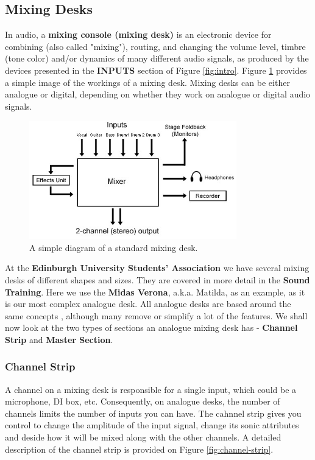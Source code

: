 \documentclass[14pt]{article} %
\begin{document}
\subsection{Mixing Desks}
\label{mixing-desks}
In audio, a \textbf{mixing console (mixing desk)} is an electronic device for combining (also called "mixing"), routing, and changing the volume level, timbre (tone color) and/or dynamics of many different audio signals, as produced by the devices presented in the \textbf{INPUTS} section of Figure \ref{fig:intro}. Figure \ref{fig:mixing-desk} provides a simple image of the workings of a mixing desk. Mixing desks can be either analogue or digital, depending on whether they work on analogue or digital audio signals. 

\begin{figure}[h]
\begin{center}

\includegraphics[width=9cm]{mixing-desk3.jpg}
\caption{A simple diagram of a standard mixing desk.}
\label{fig:mixing-desk}

\end{center}
\end{figure}

At the \textbf{Edinburgh University Students' Association} we have several mixing desks of different shapes and sizes. They are covered in more detail in the \textbf{Sound Training}. Here we use the \textbf{Midas Verona}, a.k.a. Matilda, as an example, as it is our most complex analogue desk. All analogue desks are based around the same concepts , although many remove or simplify a lot of the features. We shall now look at the two types of sections an analogue mixing desk has - \textbf{Channel Strip} and \textbf{Master Section}.


\subsubsection{Channel Strip}
\label{channel-strip}
A channel on a mixing desk is responsible for a single input, which could be a microphone, DI box, etc. Consequently, on analogue desks, the number of channels limits the number of inputs you can have. The cahnnel strip gives you control to change the amplitude of the input signal, change its sonic attributes and deside how it will be mixed along with the other channels. A detailed description of the channel strip is provided on Figure \ref{fig:channel-strip}.
\end{document}
